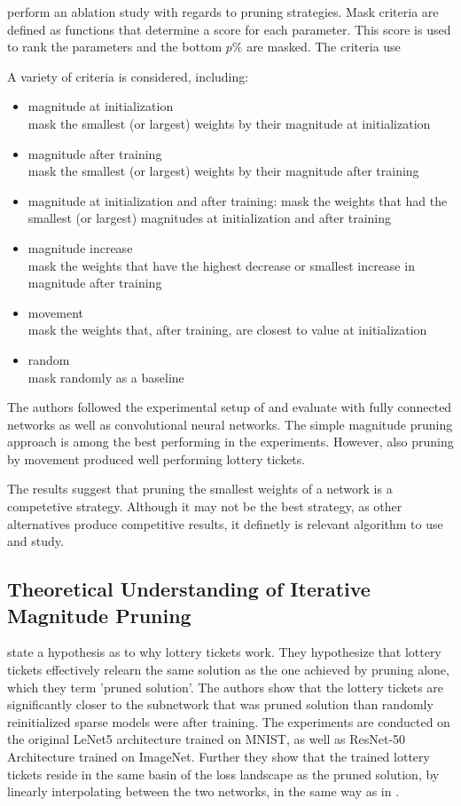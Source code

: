 \textcite{DBLP:conf/nips/ZhouLLY19} perform an ablation study with regards to pruning strategies. Mask criteria are defined as functions that determine a score for each parameter. This score is used to rank the parameters and the bottom $p\%$ are masked.
The criteria use 


A variety of criteria is considered, including: 
\begin{itemize}
  \item magnitude at initialization \\
  mask the smallest (or largest) weights by their magnitude at initialization
  \item magnitude after training \\
  mask the smallest (or largest) weights by their magnitude after training
  \item magnitude at initialization and after training: mask the weights that had the smallest (or largest) magnitudes at initialization and after training
  \item magnitude increase \\
  mask the weights that have the highest decrease or smallest increase in magnitude after training
  \item movement \\
  mask the weights that, after training, are closest to value at initialization
  \item random \\
  mask randomly as a baseline
\end{itemize}

The authors followed the experimental setup of \textcite{DBLP:conf/iclr/FrankleC19} and evaluate with fully connected networks as well as convolutional neural networks. The simple magnitude pruning approach is among the best performing in the experiments. However, also pruning by movement produced well performing lottery tickets.

The results suggest that pruning the smallest weights of a network is a competetive strategy. Although it may not be the best strategy, as other alternatives produce competitive results, it definetly is relevant algorithm to use and study. 

\subsection{Theoretical Understanding of Iterative Magnitude Pruning}
\textcite{WhyLotteryTicketsWin} state a hypothesis as to why lottery tickets work. They hypothesize that lottery tickets effectively relearn the same solution as the one achieved by pruning alone, which they term 'pruned solution'.
The authors show that the lottery tickets are significantly closer to the subnetwork that was pruned solution than randomly reinitialized sparse models were after training. 
The experiments are conducted on the original LeNet5 architecture trained on MNIST, as well as ResNet-50 Architecture trained on ImageNet. Further they show that the trained lottery tickets reside in the same basin of the loss landscape as the pruned solution, by linearly interpolating between the two networks, in the same way as in \autocite{LinearModeConnectivity}.

